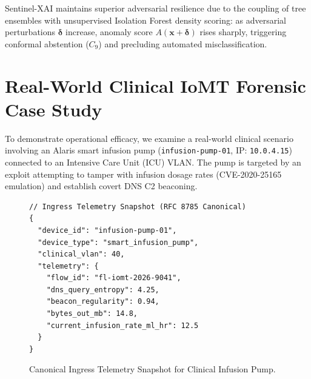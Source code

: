 \documentclass{ieeeaccess}
\begin{document}
Sentinel-XAI maintains superior adversarial resilience due to the coupling of tree ensembles with unsupervised Isolation Forest density scoring: as adversarial perturbations $\boldsymbol{\delta}$ increase, anomaly score $A(\mathbf{x} + \boldsymbol{\delta})$ rises sharply, triggering conformal abstention ($C_9$) and precluding automated misclassification.

\section{Real-World Clinical IoMT Forensic Case Study}
\label{sec:case_study}
To demonstrate operational efficacy, we examine a real-world clinical scenario involving an Alaris smart infusion pump (\texttt{infusion-pump-01}, IP: \texttt{10.0.4.15}) connected to an Intensive Care Unit (ICU) VLAN. The pump is targeted by an exploit attempting to tamper with infusion dosage rates (CVE-2020-25165 emulation) and establish covert DNS C2 beaconing.

\begin{figure}[t]
\centering
\begin{minipage}{\columnwidth}
\small
\begin{verbatim}
// Ingress Telemetry Snapshot (RFC 8785 Canonical)
{
  "device_id": "infusion-pump-01",
  "device_type": "smart_infusion_pump",
  "clinical_vlan": 40,
  "telemetry": {
    "flow_id": "fl-iomt-2026-9041",
    "dns_query_entropy": 4.25,
    "beacon_regularity": 0.94,
    "bytes_out_mb": 14.8,
    "current_infusion_rate_ml_hr": 12.5
  }
}
\end{verbatim}
\end{minipage}
\caption{Canonical Ingress Telemetry Snapshot for Clinical Infusion Pump.}
\label{fig:case_telemetry}
\end{figure}
\end{document}
